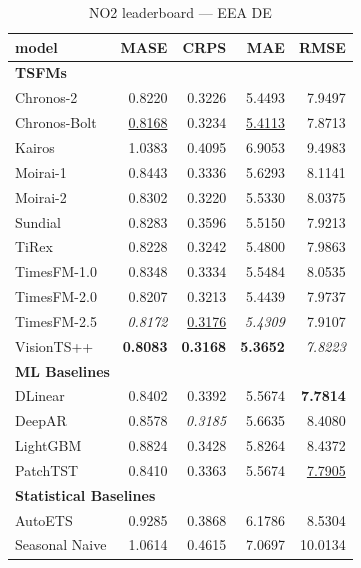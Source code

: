\begin{table}[H]
\caption{NO2 leaderboard --- EEA DE}
\centering
\begin{small}
\begin{tabular}{lrrrr}
\toprule
model & MASE & CRPS & MAE & RMSE \\
\midrule
\multicolumn{5}{l}{\textbf{TSFMs}} \\
Chronos-2 & 0.8220 & 0.3226 & 5.4493 & 7.9497 \\
Chronos-Bolt & \underline{0.8168} & 0.3234 & \underline{5.4113} & 7.8713 \\
Kairos & 1.0383 & 0.4095 & 6.9053 & 9.4983 \\
Moirai-1 & 0.8443 & 0.3336 & 5.6293 & 8.1141 \\
Moirai-2 & 0.8302 & 0.3220 & 5.5330 & 8.0375 \\
Sundial & 0.8283 & 0.3596 & 5.5150 & 7.9213 \\
TiRex & 0.8228 & 0.3242 & 5.4800 & 7.9863 \\
TimesFM-1.0 & 0.8348 & 0.3334 & 5.5484 & 8.0535 \\
TimesFM-2.0 & 0.8207 & 0.3213 & 5.4439 & 7.9737 \\
TimesFM-2.5 & \textit{0.8172} & \underline{0.3176} & \textit{5.4309} & 7.9107 \\
VisionTS++ & \textbf{0.8083} & \textbf{0.3168} & \textbf{5.3652} & \textit{7.8223} \\
\midrule
\multicolumn{5}{l}{\textbf{ML Baselines}} \\
DLinear & 0.8402 & 0.3392 & 5.5674 & \textbf{7.7814} \\
DeepAR & 0.8578 & \textit{0.3185} & 5.6635 & 8.4080 \\
LightGBM & 0.8824 & 0.3428 & 5.8264 & 8.4372 \\
PatchTST & 0.8410 & 0.3363 & 5.5674 & \underline{7.7905} \\
\midrule
\multicolumn{5}{l}{\textbf{Statistical Baselines}} \\
AutoETS & 0.9285 & 0.3868 & 6.1786 & 8.5304 \\
Seasonal Naive & 1.0614 & 0.4615 & 7.0697 & 10.0134 \\
\bottomrule
\end{tabular}
\end{small}
\end{table}